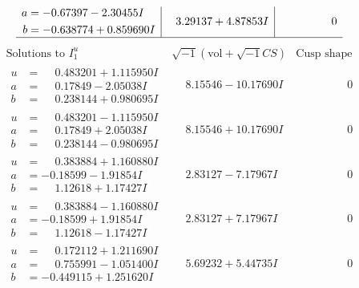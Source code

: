 \documentclass[1p]{elsarticle_modified}
\theoremstyle{definition}
\newcommand{\I}{\sqrt{-1}}
\begin{document}
$$\begin{array}{c|c|c}
\begin{aligned}
a &= -0.67397 - 2.30455 I \\
b &= -0.638774 + 0.859690 I\end{aligned}
 & \phantom{-}3.29137 + 4.87853 I & \phantom{-0.000000 } 0\\
 \hline 
 \end{array}$$\newpage$$\begin{array}{c|c|c}  
\text{Solutions to }I^u_{1}& \I (\text{vol} + \sqrt{-1}CS) & \text{Cusp shape}\\
 \hline 
\begin{aligned}
u &= \phantom{-}0.483201 + 1.115950 I \\
a &= \phantom{-}0.17849 - 2.05038 I \\
b &= \phantom{-}0.238144 + 0.980695 I\end{aligned}
 & \phantom{-}8.15546 - 10.17690 I & \phantom{-0.000000 } 0 \\ \hline\begin{aligned}
u &= \phantom{-}0.483201 - 1.115950 I \\
a &= \phantom{-}0.17849 + 2.05038 I \\
b &= \phantom{-}0.238144 - 0.980695 I\end{aligned}
 & \phantom{-}8.15546 + 10.17690 I & \phantom{-0.000000 } 0 \\ \hline\begin{aligned}
u &= \phantom{-}0.383884 + 1.160880 I \\
a &= -0.18599 - 1.91854 I \\
b &= \phantom{-}1.12618 + 1.17427 I\end{aligned}
 & \phantom{-}2.83127 - 7.17967 I & \phantom{-0.000000 } 0 \\ \hline\begin{aligned}
u &= \phantom{-}0.383884 - 1.160880 I \\
a &= -0.18599 + 1.91854 I \\
b &= \phantom{-}1.12618 - 1.17427 I\end{aligned}
 & \phantom{-}2.83127 + 7.17967 I & \phantom{-0.000000 } 0 \\ \hline\begin{aligned}
u &= \phantom{-}0.172112 + 1.211690 I \\
a &= \phantom{-}0.755991 - 1.051400 I \\
b &= -0.449115 + 1.251620 I\end{aligned}
 & \phantom{-}5.69232 + 5.44735 I & \phantom{-0.000000 } 0 \\ \hline\begin{aligned}

\end{aligned}
\end{array}$$
\end{document}
